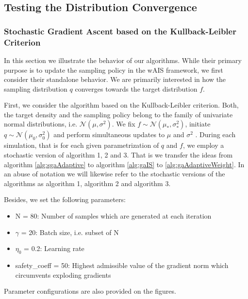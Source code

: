\subsection{Testing the Distribution Convergence}

\subsubsection{Stochastic Gradient Ascent based on the Kullback-Leibler Criterion}

In this section we illustrate the behavior of our algorithms. While their primary purpose is to update the sampling policy in the wAIS framework, we first consider their standalone behavior. We are primarily interested in how the sampling distribution $q$ converges towards the target distribution $f$. 

First, we consider the algorithm based on the Kullback-Leibler criterion. Both, the target density and the sampling policy belong to the family of univariate normal distributions, i.e. $\mathcal{N}(\mu,\sigma^2)$. We fix $f \sim \mathcal{N}(\mu_*,\sigma_*^2)$, initiate $q \sim \mathcal{N}(\mu_0,\sigma_0^2)$ and perform simultaneous updates to $\mu$ and $\sigma^2$ . During each simulation, that is for each given parametrization of $q$ and $f$, we employ a stochastic version of algorithm 1, 2 and 3. That is we transfer the ideas from algorithm \ref{alg:sgaAdaptive} to algorithm \ref{alg:gaIS} to \ref{alg:gaAdaptiveWeight}. In an abuse of notation we will likewise refer to the stochastic versions of the algorithms as algorithm 1, algorithm 2 and algorithm 3. 

Besides, we set the following parameters:

\begin{itemize}
    \item N = 80: Number of samples which are generated at each iteration
    \item $\gamma$ = 20: Batch size, i.e. subset of N
    \item $\eta_0$ = 0.2: Learning rate
    \item safety\_coeff = 50: Highest admissible value of the gradient norm which circumvents exploding gradients
\end{itemize} 
Parameter configurations are also provided on the figures.

